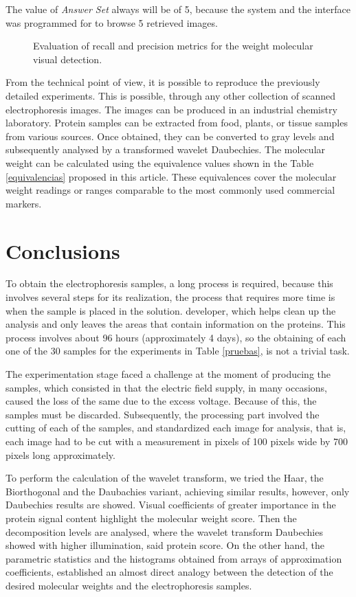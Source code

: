 \documentclass[a4paper]{llncs}
\begin{document}
The value of \textit{Answer Set} always will be of 5, because the system and the interface was programmed for to browse 5 retrieved images.

\begin{figure}[h!]
\centering{
}
\caption{Evaluation of recall and precision metrics for the weight molecular visual detection.} \label{evaluacion}
\end{figure}


From the technical point of view, it is possible to reproduce the previously detailed experiments. This is possible, through any other collection of scanned electrophoresis images. The images can be produced in an industrial chemistry laboratory. Protein samples can be extracted from food, plants, or tissue samples from various sources. Once obtained, they can be converted to gray levels and subsequently analysed by a transformed wavelet Daubechies. The molecular weight can be calculated using the equivalence values shown in the Table \ref{equivalencias} proposed in this article. These equivalences cover the molecular weight readings or ranges comparable to the most commonly used commercial markers.


\section{Conclusions}

To obtain the electrophoresis samples, a long process is required, because this involves several steps for its realization, the process that requires more time is when the sample is placed in the solution. developer, which helps clean up the analysis and only leaves the areas that contain information on the proteins. This process involves about 96 hours (approximately 4 days), so the obtaining of each one of the 30 samples for the experiments in Table \ref{pruebas}, is not a trivial task.

The experimentation stage faced a challenge at the moment of producing the samples, which consisted in that the electric field supply, in many occasions, caused the loss of the same due to the excess voltage. Because of this, the samples must be discarded. Subsequently, the processing part involved the cutting of each of the samples, and standardized each image for analysis, that is, each image had to be cut with a measurement in pixels of 100 pixels wide by 700 pixels long approximately.
 
To perform the calculation of the wavelet transform, we tried the Haar, the Biorthogonal and the Daubachies variant, achieving similar results, however, only Daubechies results are showed. Visual coefficients of greater importance in the protein signal content highlight the molecular weight score. Then the decomposition levels are analysed, where the wavelet transform Daubechies showed with higher illumination, said protein score. On the other hand, the parametric statistics and the histograms obtained from arrays of approximation coefficients, established an almost direct analogy between the detection of the desired molecular weights and the electrophoresis samples.
\end{document}
